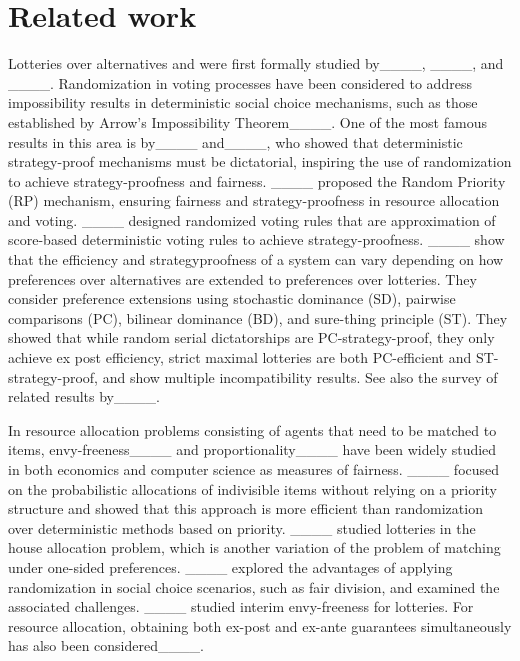 \section{Related work}
Lotteries over alternatives and were first formally studied by____, ____, and ____.
Randomization in voting processes have been considered to address impossibility results in deterministic social choice mechanisms, such as those established by Arrow’s Impossibility Theorem____. One of the most famous results in this area is by____ and____, who showed that deterministic strategy-proof mechanisms must be dictatorial, inspiring the use of randomization to achieve strategy-proofness and fairness. ____ 
proposed the Random Priority (RP) mechanism, ensuring fairness and strategy-proofness in resource allocation and voting.
____ designed randomized voting rules that are approximation of score-based deterministic voting rules to achieve strategy-proofness. 
____ show that the efficiency and strategyproofness of a system can vary depending on how preferences over alternatives are extended to preferences over lotteries. They consider preference extensions using stochastic dominance (SD),  pairwise comparisons (PC), bilinear dominance (BD), and sure-thing principle (ST). They showed that while random serial dictatorships are PC-strategy-proof, they only achieve ex post efficiency, strict maximal lotteries are both PC-efficient and ST-strategy-proof, and show multiple incompatibility results. See also the survey of related results by____.

In resource allocation problems consisting of agents that need to be matched to items, envy-freeness____ and proportionality____ have been widely studied in both economics and computer science as measures of fairness.  
____ focused on the probabilistic allocations of indivisible items without relying on a priority structure and showed that this approach is more efficient than randomization over deterministic methods based on priority. ____ studied lotteries in the house allocation problem, which is another variation of the problem of matching under one-sided preferences.
____ explored the advantages of applying randomization in social choice scenarios, such as fair division, and examined the associated challenges. ____ studied interim envy-freeness for lotteries. For resource allocation, obtaining both ex-post and ex-ante guarantees simultaneously has also been considered____.  


